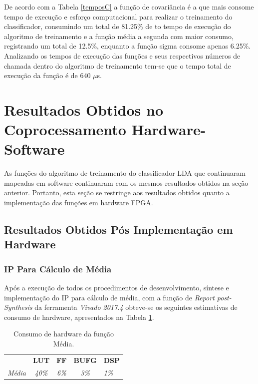 De acordo com a Tabela \ref{temposC} a função de covariância é a que mais consome tempo de execução e esforço computacional para realizar o treinamento do classificador, consumindo um total de 81.25\% de to tempo de execução do algoritmo de treinamento e a função média a segunda com maior consumo, registrando um total de 12.5\%, enquanto a função sigma consome apenas 6.25\%.\\

Analizando os tempos de execução das funções e seus respectivos números de chamada dentro do algoritmo de treinamento tem-se que o tempo total de execução da função é de 640 $\mu$s.

\section{Resultados Obtidos no Coprocessamento Hardware-Software}
As funções do algoritmo de treinamento do classificador LDA que continuaram mapeadas em software continuaram com os mesmos resultados obtidos na seção anterior. Portanto, esta seção se restringe aos resultados obtidos quanto a implementação das funções em hardware FPGA.

\subsection{Resultados Obtidos Pós Implementação em Hardware}
\subsubsection{IP Para Cálculo de Média}

Após a execução de todos os procedimentos de desenvolvimento, síntese e implementação do IP para cálculo de média, com a função de \textit{Report post-Synthesis} da ferramenta \textit{Vivado 2017.4} obteve-se os seguintes estimativas de consumo de hardware, apresentados na Tabela \ref{consumo_media}.

\begin{table}[!h]
	\centering
	\caption{Consumo de hardware da função Média.}
	\label{consumo_media}
	\begin{tabular}{ccccl}
		\textbf{}         & \textbf{LUT}  & \textbf{FF}  & \textbf{BUFG} & \textbf{DSP} \\
		\textit{Média} & \textit{40\%} & \textit{6\%} & \textit{3\%}  & \textit{1\%}
	\end{tabular}
\end{table}

